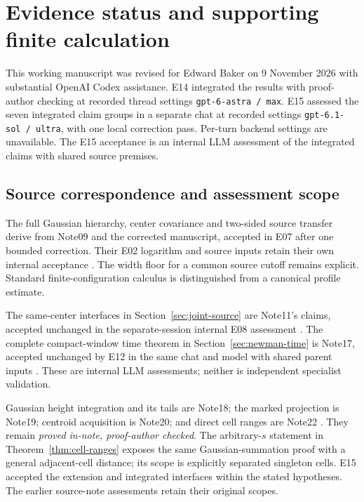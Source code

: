 \section{Evidence status and supporting finite calculation}\label{app:status}

This working manuscript was revised for Edward Baker on 9 November 2026
with substantial OpenAI Codex assistance. E14 integrated the results
with proof-author checking at recorded thread settings
\texttt{gpt-6-astra / max}. E15 assessed the seven integrated claim
groups in a separate chat at recorded settings \texttt{gpt-6.1-sol /
ultra}, with one local correction pass. Per-turn backend settings
are unavailable. The E15 acceptance is an internal LLM assessment
of the integrated claims with shared source premises.

\subsection{Source correspondence and assessment scope}

The full Gaussian hierarchy, center covariance and two-sided source
transfer derive from Note09 and the corrected manuscript, accepted in
E07 after one bounded correction. Their E02 logarithm and source inputs
retain their own internal acceptance
\cite{OCGaussian,OCLog,OCConsumer,OCReviewE02}. The width floor for a
common source cutoff remains explicit. Standard finite-configuration
calculus is distinguished from a canonical profile estimate.

The same-center interfaces in Section~\ref{sec:joint-source} are Note11's
claims, accepted unchanged in the separate-session internal E08 assessment
\cite{OCJoint,OCJointReview}. The complete compact-window time theorem
in Section~\ref{sec:newman-time} is Note17, accepted unchanged by E12
in the same chat and model with shared parent inputs
\cite{OCTime,OCTimeReview,ParentModulus}. These are internal LLM
assessments; neither is independent specialist validation.

Gaussian height integration and its tails are Note18; the marked
projection is Note19; centroid acquisition is Note20; and direct
cell ranges are Note22 \cite{OCGaussianWindow,OCProjection,OCCentroids,OCCellRanges}.
They remain \emph{proved in-note, proof-author checked}.
The arbitrary-$s$ statement in Theorem~\ref{thm:cell-ranges} exposes the
same Gaussian-summation proof with a general adjacent-cell distance;
its scope is explicitly separated singleton cells. E15 accepted the
extension and integrated interfaces within the stated hypotheses.
The earlier source-note assessments retain their original scopes.


